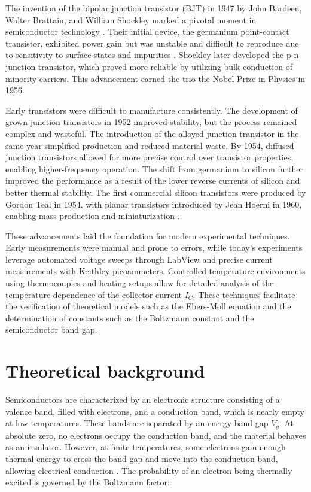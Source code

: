 \documentclass[12pt,letterpaper,onecolumn]{article}
\begin{document}
The invention of the bipolar junction transistor (BJT) in 1947 by John Bardeen, Walter Brattain, and William Shockley marked a pivotal moment in semiconductor technology \cite{Neudeck}. Their initial device, the germanium point-contact transistor, exhibited power gain but was unstable and difficult to reproduce due to sensitivity to surface states and impurities \cite{Lukasiak}. Shockley later developed the p-n junction transistor, which proved more reliable by utilizing bulk conduction of minority carriers. This advancement earned the trio the Nobel Prize in Physics in 1956.

Early transistors were difficult to manufacture consistently. The development of grown junction transistors in 1952 improved stability, but the process remained complex and wasteful. The introduction of the alloyed junction transistor in the same year simplified production and reduced material waste. By 1954, diffused junction transistors allowed for more precise control over transistor properties, enabling higher-frequency operation. The shift from germanium to silicon further improved the performance as a result of the lower reverse currents of silicon and better thermal stability. The first commercial silicon transistors were produced by Gordon Teal in 1954, with planar transistors introduced by Jean Hoerni in 1960, enabling mass production and miniaturization \cite{Lukasiak}.

These advancements laid the foundation for modern experimental techniques. Early measurements were manual and prone to errors, while today's experiments leverage automated voltage sweeps through LabView and precise current measurements with Keithley picoammeters. Controlled temperature environments using thermocouples and heating setups allow for detailed analysis of the temperature dependence of the collector current \( I_C \). These techniques facilitate the verification of theoretical models such as the Ebers-Moll equation and the determination of constants such as the Boltzmann constant and the semiconductor band gap.


\section{Theoretical background}

Semiconductors are characterized by an electronic structure consisting of a valence band, filled with electrons, and a conduction band, which is nearly empty at low temperatures. These bands are separated by an energy band gap \( V_g \). At absolute zero, no electrons occupy the conduction band, and the material behaves as an insulator. However, at finite temperatures, some electrons gain enough thermal energy to cross the band gap and move into the conduction band, allowing electrical conduction \cite{Thornton}. The probability of an electron being thermally excited is governed by the Boltzmann factor:
\end{document}
